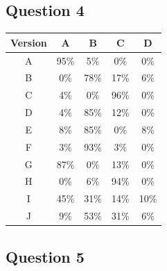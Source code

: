 \documentclass[12pt, a4paper]{article}
\begin{document}
	\subsection{Question 4}
	
	\begin{table}[H]
		\centering
		\renewcommand{\arraystretch}{1.3}
		\begin{tabular}{ccccc}
			\toprule
			\rowcolor{primary}
			\color{white}\textbf{Version} &
			\color{white}\textbf{A} &
			\color{white}\textbf{B} &
			\color{white}\textbf{C} &
			\color{white}\textbf{D} \\
			\midrule
			\rowcolor{rowA} A & 95\% &  5\% &  0\% &  0\% \\
			\rowcolor{rowB} B &  0\% & 78\% & 17\% &  6\% \\
			\rowcolor{rowA} C &  4\% &  0\% & 96\% &  0\% \\
			\rowcolor{rowB} D &  4\% & 85\% & 12\% &  0\% \\
			\rowcolor{rowA} E &  8\% & 85\% &  0\% &  8\% \\
			\rowcolor{rowB} F &  3\% & 93\% &  3\% &  0\% \\
			\rowcolor{rowA} G & 87\% &  0\% & 13\% &  0\% \\
			\rowcolor{rowB} H &  0\% &  6\% & 94\% &  0\% \\
			\rowcolor{rowA} I & 45\% & 31\% & 14\% & 10\% \\
			\rowcolor{rowB} J &  9\% & 53\% & 31\% &  6\% \\
			\bottomrule
		\end{tabular}
	\end{table}
	
	\subsection{Question 5}
	
\end{document}
